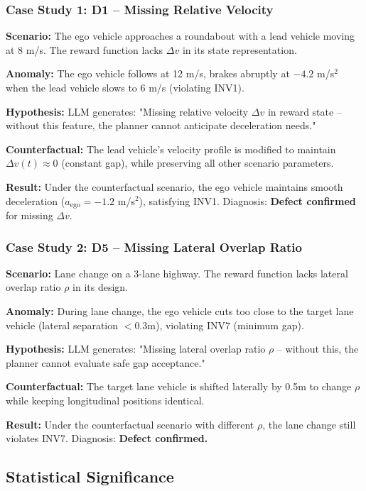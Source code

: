 \documentclass[conference]{IEEEtran}
\theoremstyle{plain}
\begin{document}
\subsubsection{Case Study 1: D1 -- Missing Relative Velocity}

\textbf{Scenario:} The ego vehicle approaches a roundabout with a lead vehicle moving at 8 m/s. The reward function lacks $\Delta v$ in its state representation.

\textbf{Anomaly:} The ego vehicle follows at 12 m/s, brakes abruptly at $-4.2$ m/s$^2$ when the lead vehicle slows to 6 m/s (violating INV1).

\textbf{Hypothesis:} LLM generates: "Missing relative velocity $\Delta v$ in reward state -- without this feature, the planner cannot anticipate deceleration needs."

\textbf{Counterfactual:} The lead vehicle's velocity profile is modified to maintain $\Delta v(t) \approx 0$ (constant gap), while preserving all other scenario parameters.

\textbf{Result:} Under the counterfactual scenario, the ego vehicle maintains smooth deceleration ($a_{\text{ego}} = -1.2$ m/s$^2$), satisfying INV1. Diagnosis: \textbf{Defect confirmed} for missing $\Delta v$.

\subsubsection{Case Study 2: D5 -- Missing Lateral Overlap Ratio}

\textbf{Scenario:} Lane change on a 3-lane highway. The reward function lacks lateral overlap ratio $\rho$ in its design.

\textbf{Anomaly:} During lane change, the ego vehicle cuts too close to the target lane vehicle (lateral separation $< 0.3$m), violating INV7 (minimum gap).

\textbf{Hypothesis:} LLM generates: "Missing lateral overlap ratio $\rho$ -- without this, the planner cannot evaluate safe gap acceptance."

\textbf{Counterfactual:} The target lane vehicle is shifted laterally by 0.5m to change $\rho$ while keeping longitudinal positions identical.

\textbf{Result:} Under the counterfactual scenario with different $\rho$, the lane change still violates INV7. Diagnosis: \textbf{Defect confirmed.}

\subsection{Statistical Significance}
\end{document}

